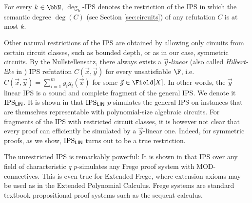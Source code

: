\documentclass[a4paper,UKenglish,cleveref, autoref, thm-restate]{lipics-v2021}
\newcommand{\IPSlin}{\text{\upshape IPS}_{\mathsf{LIN}}}
\begin{document}
	For every $k \in \bbN$, $\deg_k$-IPS denotes the restriction of the IPS 
	in which the semantic degree $\deg(C)$ (see Section \ref{sec:circuits}) of any refutation $C$ is at most $k$. %
	
	Other natural restrictions of the IPS are obtained by allowing only circuits from certain circuit classes, such as bounded depth, or as in our case, symmetric circuits.
	By the Nullstellensatz, there always exists a \textit{$\vec y$-linear} (also called 
	\textit{Hilbert-like} in \cite{IPS}) IPS refutation
	$C(\vec x, \vec y)$ for every unsatisfiable $\F$, i.e.\ 
	$
	C(\vec x, \vec y) = \sum_{i=1}^m y_i g_i(\vec x)
	$
	for some $\vec g \in \Field[X]$. In other words, the $\vec y$-linear IPS is a sound and complete fragment of the general IPS. We denote it $\IPSlin$.
	It is shown in \cite{IPS} that $\IPSlin$ $p$-simulates the general IPS on instances that are themselves representable with polynomial-size algebraic circuits. 
	For fragments of the IPS with restricted circuit classes, it is however not clear that every proof can efficiently be simulated by a $\vec y$-linear one. Indeed, for symmetric proofs, as we show, $\IPSlin$ turns out to be a true restriction. 

The unrestricted IPS is remarkably powerful: It is shown in \cite[Theorem 3.5]{IPS} that IPS over any field of characteristic $q$ $p$-simulates any Frege proof system with MOD-connectives. This is even true for Extended Frege, where extension axioms may be used as in the Extended Polynomial Calculus. Frege systems are standard textbook propositional proof systems such as the sequent calculus.
	
	
\end{document}
